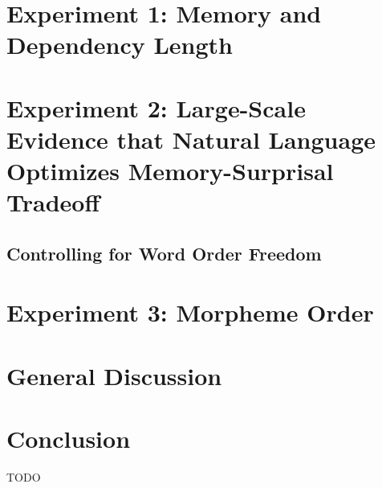 \documentclass[11pt,letterpaper]{article}
\begin{document}


\section{Experiment 1: Memory and Dependency Length}



%


\section{Experiment 2: Large-Scale Evidence that Natural Language Optimizes Memory-Surprisal Tradeoff}
\label{sec:main-experiment}



\subsection{Controlling for Word Order Freedom}\label{subsec:freedom}



\section{Experiment 3: Morpheme Order}




\section{General Discussion}




\section{Conclusion}

TODO




\end{document}
